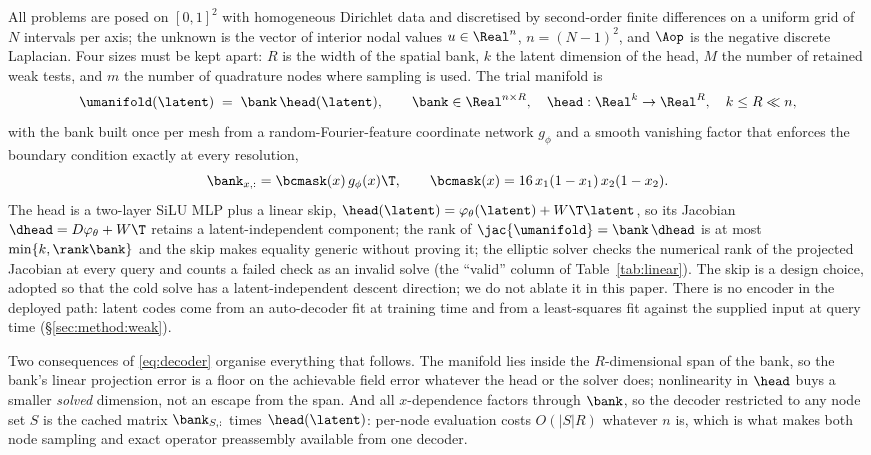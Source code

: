 All problems are posed on $[0,1]^2$ with homogeneous Dirichlet data and
discretised by second-order finite differences on a uniform grid of $N$
intervals per axis; the unknown is the vector of interior nodal values
$u\in\Real^{n}$, $n=(N-1)^2$, and $\Aop$ is the negative discrete Laplacian.
Four sizes must be kept apart: $R$ is the width of the spatial bank, $k$ the
latent dimension of the head, $M$ the number of retained weak tests, and $m$ the
number of quadrature nodes where sampling is used. The trial manifold is
\begin{equation}
  \umanifold(\latent) \;=\; \bank\,\head(\latent),
  \qquad
  \bank\in\Real^{n\times R},\quad
  \head:\Real^{k}\to\Real^{R},\quad k\le R\ll n,
  \label{eq:decoder}
\end{equation}
with the bank built once per mesh from a random-Fourier-feature coordinate
network $g_\phi$ \citep{Tancik2020FourierFeatures} and a smooth vanishing
factor that enforces the boundary condition exactly at every resolution,
\begin{equation}
  \bank_{x,:} = \bcmask(x)\,g_\phi(x)\T,
  \qquad
  \bcmask(x) = 16\,x_1(1-x_1)\,x_2(1-x_2).
  \label{eq:bank}
\end{equation}
The head is a two-layer SiLU MLP plus a linear skip,
$\head(\latent)=\varphi_\theta(\latent)+W\T\latent$, so its Jacobian
$\dhead=D\varphi_\theta+W\T$ retains a latent-independent component; the rank
of $\jac{\umanifold}=\bank\,\dhead$ is at most $\min\{k,\rank\bank\}$ and the
skip makes equality generic without proving it; the elliptic solver checks the
numerical rank of the projected Jacobian at every query and counts a failed
check as an invalid solve (the ``valid'' column of Table~\ref{tab:linear}).
The skip is a design choice, adopted so that the cold solve has a
latent-independent descent direction; we do not ablate it in this paper. There is no
encoder in the deployed path: latent codes come from an auto-decoder fit at
training time and from a least-squares fit against the supplied input at query
time (\S\ref{sec:method:weak}).

Two consequences of \eqref{eq:decoder} organise everything that follows. The
manifold lies inside the $R$-dimensional span of the bank, so the bank's linear
projection error is a floor on the achievable field error whatever the head or
the solver does; nonlinearity in $\head$ buys a smaller \emph{solved} dimension,
not an escape from the span. And all $x$-dependence factors through $\bank$, so
the decoder restricted to any node set $S$ is the cached matrix $\bank_{S,:}$
times $\head(\latent)$: per-node evaluation costs $O(|S|R)$ whatever $n$ is,
which is what makes both node sampling and exact operator preassembly available
from one decoder.

